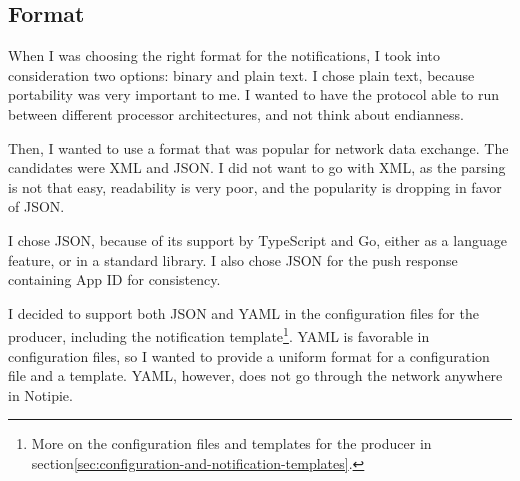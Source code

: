 \subsection{Format}\label{sec:protocol-format}

When I was choosing the right format
for the notifications,
I took into consideration two options:
binary and plain text.
I chose plain text,
because portability was very important to me.
I wanted to have the protocol able to run
between different processor architectures,
and not think about endianness.

Then, I wanted to use a format
that was popular for network data exchange.
The candidates were XML and JSON.
I did not want to go with XML,
as the parsing is not that easy,
readability is very poor,
and the popularity is dropping
in favor of JSON.

I chose JSON,
because of its support by TypeScript and Go,
either as a language feature,
or in a standard library.
I also chose JSON for the push response
containing App ID
for consistency.

I decided to support both JSON and YAML
in the configuration files for the producer,
including the notification template\footnote{
  More on the configuration files and templates
  for the producer
  in section\ref{sec:configuration-and-notification-templates}.
}.
YAML is favorable in configuration files,
so I wanted to provide a uniform
format for a configuration file
and a template.
YAML, however,
does not go through the network
anywhere in Notipie.

